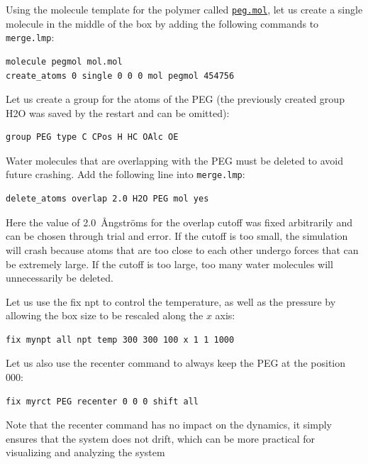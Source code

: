 \documentclass[9pt,tutorial]{livecoms}
\newcommand{\lmpcmd}[1]{\hspace{0pt}\colorbox{listing}{\textcolor{command}{\small{#1}}}\hspace{0pt}} %
\newcommand{\flecmd}[1]{\textcolor{command}{\texttt{#1}}} %
\newcommand{\dwlcmd}[1]{\textcolor{download}{\texttt{#1}}} %
\newcommand{\filepath}{https://raw.githubusercontent.com/lammpstutorials/lammpstutorials-article/main/files/}
\begin{document}
Using the molecule template for the polymer called
\href{\filepath tutorial3/peg.mol}{\dwlcmd{peg.mol}},
let us create a single molecule in the middle of the box by adding the following
commands to \flecmd{merge.lmp}:
\begin{lstlisting}
molecule pegmol mol.mol
create_atoms 0 single 0 0 0 mol pegmol 454756
\end{lstlisting}
Let us create a group for the atoms of the PEG (the previously created
group H2O was saved by the restart and can be omitted):
\begin{lstlisting}
group PEG type C CPos H HC OAlc OE
\end{lstlisting}
Water molecules that are overlapping with the PEG must be deleted to avoid future
crashing.  Add the following line into \flecmd{merge.lmp}:
\begin{lstlisting}
delete_atoms overlap 2.0 H2O PEG mol yes
\end{lstlisting}
Here the value of 2.0~Ångströms for the overlap cutoff was fixed arbitrarily and can
be chosen through trial and error.  If the cutoff is too small, the simulation will
crash because atoms that are too close to each other undergo forces
that can be extremely large.  If the cutoff is too large, too many water
molecules will unnecessarily be deleted.

Let us use the \lmpcmd{fix npt} to control the temperature, as
well as the pressure by allowing the box size to be rescaled along the $x$ axis:
\begin{lstlisting}
fix mynpt all npt temp 300 300 100 x 1 1 1000
\end{lstlisting}
Let us also use the \lmpcmd{recenter} command to always keep the PEG at
the position $0 0 0$:
\begin{lstlisting}
fix myrct PEG recenter 0 0 0 shift all
\end{lstlisting}
Note that the \lmpcmd{recenter} command has no impact on the dynamics,
it simply ensures that the system does not drift, which can be more practical for visualizing and analyzing the system
\end{document}
